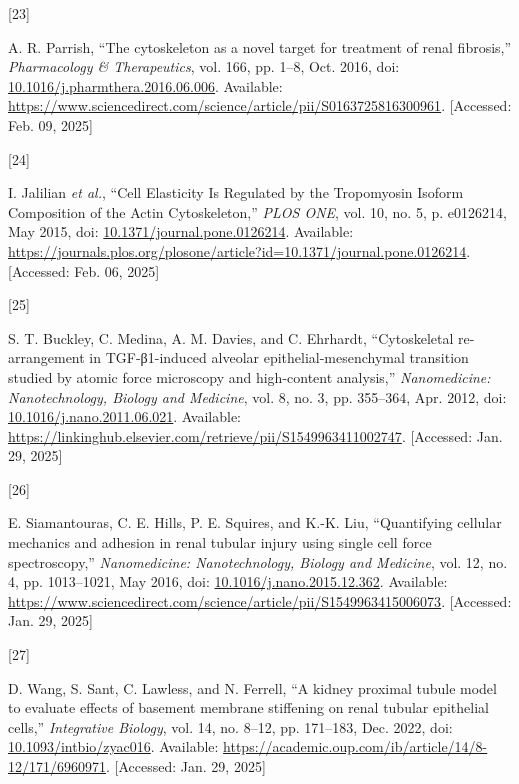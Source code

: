 \documentclass[
  paper=a4,
  ,captions=tableheading
]{scrartcl}
\newlength{\cslhangindent}
\newlength{\csllabelwidth}
\newenvironment{CSLReferences}[2] %
  {\begin{list}{}{%
   \setlength{\itemindent}{0pt}
   \setlength{\leftmargin}{0pt}
   \setlength{\parsep}{0pt}
   \ifodd #1
    \setlength{\leftmargin}{\cslhangindent}
    \setlength{\itemindent}{-1\cslhangindent}
   \fi
   \setlength{\itemsep}{#2\baselineskip}}}
  {\end{list}}
\newcommand{\CSLLeftMargin}[1]{\parbox[t]{\csllabelwidth}{\strut#1\strut}}
\newcommand{\CSLRightInline}[1]{\parbox[t]{\linewidth - \csllabelwidth}{\strut#1\strut}}
\begin{document}
\begin{CSLReferences}{0}{0}
\CSLLeftMargin{{[}23{]} }%
\CSLRightInline{A. R. Parrish, {``The cytoskeleton as a novel target for
treatment of renal fibrosis,''} \emph{Pharmacology \& Therapeutics},
vol. 166, pp. 1--8, Oct. 2016, doi:
\href{https://doi.org/10.1016/j.pharmthera.2016.06.006}{10.1016/j.pharmthera.2016.06.006}.
Available:
\url{https://www.sciencedirect.com/science/article/pii/S0163725816300961}.
{[}Accessed: Feb. 09, 2025{]}}

\CSLLeftMargin{{[}24{]} }%
\CSLRightInline{I. Jalilian \emph{et al.}, {``Cell {Elasticity Is
Regulated} by the {Tropomyosin Isoform Composition} of the {Actin
Cytoskeleton},''} \emph{PLOS ONE}, vol. 10, no. 5, p. e0126214, May
2015, doi:
\href{https://doi.org/10.1371/journal.pone.0126214}{10.1371/journal.pone.0126214}.
Available:
\url{https://journals.plos.org/plosone/article?id=10.1371/journal.pone.0126214}.
{[}Accessed: Feb. 06, 2025{]}}

\CSLLeftMargin{{[}25{]} }%
\CSLRightInline{S. T. Buckley, C. Medina, A. M. Davies, and C. Ehrhardt,
{``Cytoskeletal re-arrangement in {TGF-β1-induced} alveolar
epithelial-mesenchymal transition studied by atomic force microscopy and
high-content analysis,''} \emph{Nanomedicine: Nanotechnology, Biology
and Medicine}, vol. 8, no. 3, pp. 355--364, Apr. 2012, doi:
\href{https://doi.org/10.1016/j.nano.2011.06.021}{10.1016/j.nano.2011.06.021}.
Available:
\url{https://linkinghub.elsevier.com/retrieve/pii/S1549963411002747}.
{[}Accessed: Jan. 29, 2025{]}}

\CSLLeftMargin{{[}26{]} }%
\CSLRightInline{E. Siamantouras, C. E. Hills, P. E. Squires, and K.-K.
Liu, {``Quantifying cellular mechanics and adhesion in renal tubular
injury using single cell force spectroscopy,''} \emph{Nanomedicine:
Nanotechnology, Biology and Medicine}, vol. 12, no. 4, pp. 1013--1021,
May 2016, doi:
\href{https://doi.org/10.1016/j.nano.2015.12.362}{10.1016/j.nano.2015.12.362}.
Available:
\url{https://www.sciencedirect.com/science/article/pii/S1549963415006073}.
{[}Accessed: Jan. 29, 2025{]}}

\CSLLeftMargin{{[}27{]} }%
\CSLRightInline{D. Wang, S. Sant, C. Lawless, and N. Ferrell, {``A
kidney proximal tubule model to evaluate effects of basement membrane
stiffening on renal tubular epithelial cells,''} \emph{Integrative
Biology}, vol. 14, no. 8--12, pp. 171--183, Dec. 2022, doi:
\href{https://doi.org/10.1093/intbio/zyac016}{10.1093/intbio/zyac016}.
Available:
\url{https://academic.oup.com/ib/article/14/8-12/171/6960971}.
{[}Accessed: Jan. 29, 2025{]}}


\end{CSLReferences}
\end{document}
